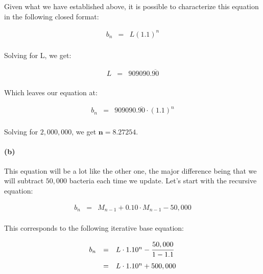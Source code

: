 \documentclass[a4paper]{article}
\begin{document}
Given what we have established above, it is possible to characterize this equation in the following closed format:

\begin{equation*}
\begin{array}{rcl}
b_n & = & L(1.1)^n \\[.1in]
\end{array}
\end{equation*}

Solving for L, we get:

\begin{equation*}
\begin{array}{rcl}
L & = & 909090.\overline{90} \\[.08in]
\end{array}
\end{equation*}

Which leaves our equation at:

\begin{equation*}
\begin{array}{rcl}
b_n & = & 909090.\overline{90} \cdot (1.1)^n \\[.08in]
\end{array}
\end{equation*}

Solving for $2,000,000$, we get $\mathbf{n=8.27254}$.

\paragraph{(b)} This equation will be a lot like the other one, the major difference being that we will subtract $50,000$ bacteria each time we update. Let's start with the recursive equation:

\begin{equation*}
\begin{array}{rcl}
b_n & = & M_{n-1} + 0.10 \cdot M_{n-1} - 50,000 \\[.08in]
\end{array}
\end{equation*}

This corresponds to the following iterative base equation:

\begin{equation*}
\begin{array}{rcl}
b_n & = & L \cdot 1.10^n - \cfrac{50,000}{1-1.1 } \\[.15in]
& = & L \cdot 1.10^n + 500,000 \\[.08in]
\end{array}
\end{equation*}
\end{document}
